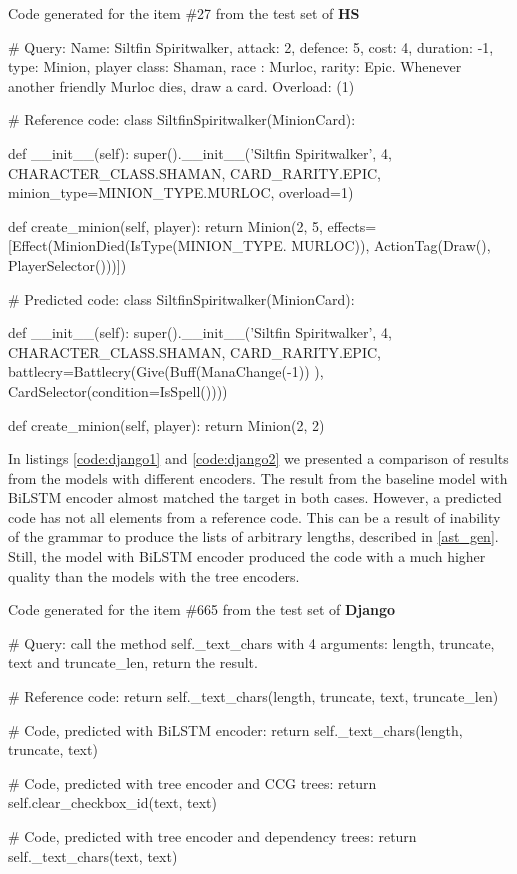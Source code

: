 \begin{codelist}{Code generated for the item \#27 from the test set of \textbf{HS}}
\begin{verbnobox}[\verbarg]
# Query:
Name: Siltfin Spiritwalker, attack: 2, defence: 5, 
cost: 4, duration: -1, type: Minion, 
player class: Shaman, race : Murloc, rarity: Epic. 
Whenever another friendly Murloc dies, draw a card.
Overload: (1)

# Reference code:
class SiltfinSpiritwalker(MinionCard):

    def __init__(self):
        super().__init__('Siltfin Spiritwalker', 4, CHARACTER_CLASS.SHAMAN,
            CARD_RARITY.EPIC, minion_type=MINION_TYPE.MURLOC, overload=1)

    def create_minion(self, player):
        return Minion(2, 5, effects=[Effect(MinionDied(IsType(MINION_TYPE.
            MURLOC)), ActionTag(Draw(), PlayerSelector()))])

# Predicted code:
class SiltfinSpiritwalker(MinionCard):

    def __init__(self):
        super().__init__('Siltfin Spiritwalker', 4, CHARACTER_CLASS.SHAMAN,
            CARD_RARITY.EPIC, battlecry=Battlecry(Give(Buff(ManaChange(-1))
            ), CardSelector(condition=IsSpell())))

    def create_minion(self, player):
        return Minion(2, 2)
        
\end{verbnobox}
\label{code:hs2}
\end{codelist}

In listings \ref{code:django1} and \ref{code:django2} we presented a comparison of results from the models with different encoders. The result from the baseline model with BiLSTM encoder almost matched the target in both cases. However, a predicted code has not all elements from a reference code. This can be a result of inability of the grammar to produce the lists of arbitrary lengths, described in \cref{ast_gen}. Still, the model with BiLSTM encoder produced the code with a much higher quality than the models with the tree encoders.

\begin{codelist}{Code generated for the item \#665 from the test set of \textbf{Django}}
\begin{verbnobox}[\verbarg]
# Query:
call the method self._text_chars with 4 arguments: length,
truncate, text and truncate_len, return the result.

# Reference code:
return self._text_chars(length, truncate, text, truncate_len)

# Code, predicted with BiLSTM encoder:
return self._text_chars(length, truncate, text)
        
# Code, predicted with tree encoder and CCG trees:
return self.clear_checkbox_id(text, text)

# Code, predicted with tree encoder and dependency trees:
return self._text_chars(text, text)
\end{verbnobox}
\label{code:django1}
\end{codelist}

